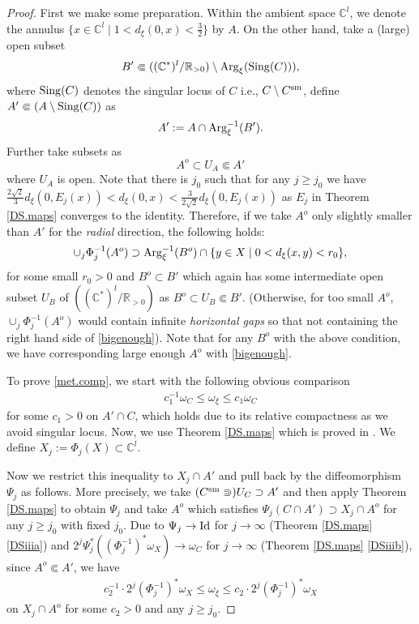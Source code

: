 \documentclass[12pt,a4paper]{amsart}
\theoremstyle{remark}
\theoremstyle{definition}
\def\R{\mathbb{R}}
\def\C{\mathbb{C}}
\begin{document}
\begin{proof}
First we make some preparation. 
Within the ambient space $\C^l$, 
we denote the annulus 
$\{x\in \C^l\mid 1<d_\xi(0,x)<\frac{3}{2}\}$ 
by $A$. 
On the other hand, take a (large) open subset 
$$B'\Subset 
((\C^*)^l/\R_{>0})\setminus 
{\rm Arg}_{\xi}({\rm Sing}(C))),$$ 
where ${\rm Sing}(C)$ denotes the singular locus of $C$ i.e., $C\setminus C^{\rm sm}$, 
define $A'\Subset 
(A\setminus {\rm Sing}(C))$ as 
$$A':=A\cap {\rm Arg}_{\xi}^{-1}(B').$$ 
Further take subsets as $$A^o\subset U_A  
\Subset A'$$ where $U_A$ is open. 
Note that 
there is $j_0$ such that for any $j\ge j_0$ we have 
$\frac{2\sqrt{2}}{3}d_\xi(0,E_j(x))<d_\xi(0,x)<\frac{3}{2\sqrt{2}}d_\xi(0,E_j(x))$ as $E_j$ in 
Theorem \ref{DS.maps} converges to the identity. 
Therefore, if 
we take $A^o$ only 
slightly smaller than $A'$ for the {\it radial} direction, 
the following holds: 
\begin{align}\label{bigenough}
    \cup_j \Phi_j^{-1}(A^o)\supset 
{\rm Arg}_{\xi}^{-1}(B^o)\cap \{y\in X\mid 0<d_\xi(x,y)<r_0\},
\end{align}
for some small $r_0>0$ 
and $B^o\subset B'$ which again has some 
intermediate open subset $U_B$ of 
$((\C^*)^l/\R_{>0})$ 
as 
$B^o\subset U_B\Subset B'$. 
(Otherwise, for too small $A^o$, $\cup_j \Phi_j^{-1}(A^o)$ would 
contain infinite {\it  horizontal gaps} so that not containing the right hand side 
of \eqref{bigenough}). 
Note that for any $B^o$ with the above condition, we have corresponding large enough $A^o$ with \eqref{bigenough}. 

To prove \eqref{met.comp}, 
we start with the following obvious comparison 
\begin{align}\label{comp.A}
c_1^{-1}\omega_C\le \omega_\xi\le c_1 \omega_C    
\end{align}
for some $c_1>0$ 
on $A'\cap C$, which holds due to 
its relative compactness as we avoid 
singular locus. 
Now, we use Theorem \ref{DS.maps} which is proved 
in \cite{DSII}. We define $X_j:=\Phi_j(X)\subset \C^l$. 

Now we restrict this inequality 
to $X_j\cap A'$ and pull back by the diffeomorphism 
$\Psi_j$ as follows. More precisely, 
we take $(C^{\rm sm}\Supset) U_C\supset A'$ 
and then apply Theorem \ref{DS.maps} to obtain $\Psi_j$ 
and take $A^o$ which satisfies $\Psi_j(C\cap A')\supset X_j\cap A^o$ 
for any $j\ge j_0$ with fixed $j_0$. 
Due to 
    $\Psi_j\to {\rm Id}$ for $j\to \infty$ 
    (Theorem \ref{DS.maps} \eqref{DSiiia}) 
and 
$2^j \Psi_j^*((\Phi_j^{-1})^*\omega_X)\to \omega_C$ for $j\to \infty$ (Theorem \ref{DS.maps} \eqref{DSiiib}), 
since $A^o\Subset A'$, 
we have 
\begin{align}\label{comp.Xj}
    c_2^{-1}\cdot 2^j (\Phi_j^{-1})^*\omega_X
\le \omega_\xi\le c_2\cdot 2^j (\Phi_j^{-1})^*\omega_X
\end{align}
on $X_j\cap A^o$ 
for some $c_2>0$ and any $j\ge j_0$. 


\end{proof}
\end{document}

